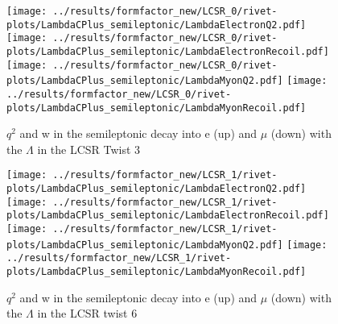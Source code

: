 \begin{figure}[h]
  \centering
  \texttt{[image: ../results/formfactor\_new/LCSR\_0/rivet-plots/LambdaCPlus\_semileptonic/LambdaElectronQ2.pdf]}
  \texttt{[image: ../results/formfactor\_new/LCSR\_0/rivet-plots/LambdaCPlus\_semileptonic/LambdaElectronRecoil.pdf]}\\
  \texttt{[image: ../results/formfactor\_new/LCSR\_0/rivet-plots/LambdaCPlus\_semileptonic/LambdaMyonQ2.pdf]}
  \texttt{[image: ../results/formfactor\_new/LCSR\_0/rivet-plots/LambdaCPlus\_semileptonic/LambdaMyonRecoil.pdf]}
  \caption{\(q^2\) and w in the semileptonic decay into e (up) and \(\mu\) (down) with the \(\Lambda\) in the LCSR Twist 3}
\end{figure}
\begin{figure}[h]
  \centering
  \texttt{[image: ../results/formfactor\_new/LCSR\_1/rivet-plots/LambdaCPlus\_semileptonic/LambdaElectronQ2.pdf]}
  \texttt{[image: ../results/formfactor\_new/LCSR\_1/rivet-plots/LambdaCPlus\_semileptonic/LambdaElectronRecoil.pdf]}\\
  \texttt{[image: ../results/formfactor\_new/LCSR\_1/rivet-plots/LambdaCPlus\_semileptonic/LambdaMyonQ2.pdf]}
  \texttt{[image: ../results/formfactor\_new/LCSR\_1/rivet-plots/LambdaCPlus\_semileptonic/LambdaMyonRecoil.pdf]}
  \caption{\(q^2\) and w in the semileptonic decay into e (up) and \(\mu\) (down) with the \(\Lambda\) in the LCSR twist 6}
\end{figure}

